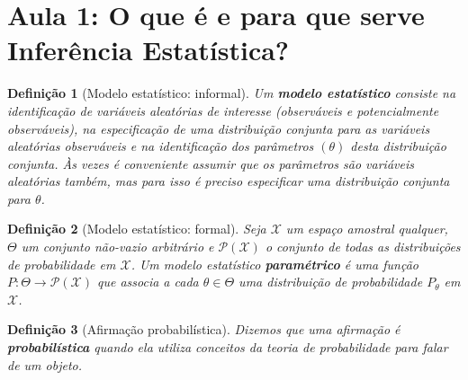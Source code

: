 \documentclass{article}
\newtheorem{definition}{Definição}
\begin{document}
\textbf{}
\vspace{2.9mm}

\textbf{}
\vspace{2.9mm}

\textbf{}
\vspace{2.9mm}

\textbf{}
\vspace{2.9mm}

\textbf{}
\vspace{2.9mm}

\textbf{}
\vspace{2.9mm}

\textbf{}

\newpage

\section*{Aula 1: O que é e para que serve Inferência Estatística?}
\label{s1}

\begin{definition}[Modelo estatístico: informal]
Um \textbf{modelo estatístico} consiste na identificação de variáveis aleatórias de interesse (observáveis e potencialmente observáveis), na especificação de uma distribuição conjunta para as variáveis aleatórias observáveis e na identificação dos parâmetros $(\theta)$ desta distribuição conjunta. Às vezes é conveniente assumir que os parâmetros são variáveis aleatórias também, mas para isso é preciso especificar uma distribuição conjunta para $\theta$.
\end{definition}

\begin{definition}[Modelo estatístico: formal]
Seja $\mathcal{X}$ um espaço amostral qualquer, $\Theta$ um conjunto não-vazio arbitrário e $\mathcal{P(X)}$ o conjunto de todas as distribuições de probabilidade em $\mathcal{X}$. Um modelo estatístico \textbf{paramétrico} é uma função $P: \Theta \rightarrow \mathcal{P(X)}$ que associa a cada $\theta \in \Theta$ uma distribuição de probabilidade $P_\theta$ em $\mathcal{X}$.
\end{definition}

\begin{definition}[Afirmação probabilística]
Dizemos que uma afirmação é \textbf{probabilística} quando ela utiliza conceitos da teoria de probabilidade para falar de um objeto.
\end{definition}
\end{document}
